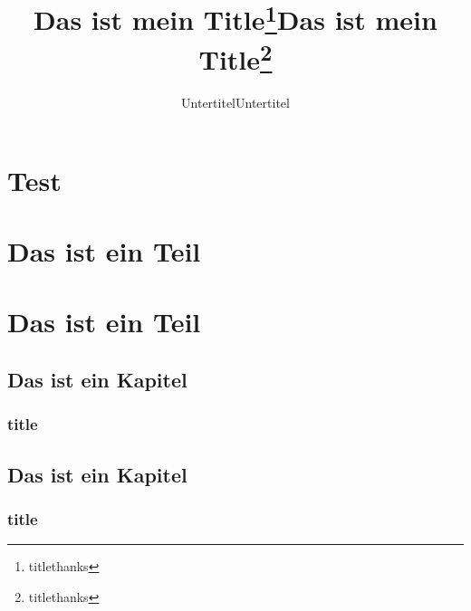 \documentclass[ngerman,%
cd=true,cd=pale,
cdgeometry=false,
cdfont=ultrabold,
headings=heavy,
]{tudscrreprt}
\providecommand{\graduation}[1]{}
\providecommand{\thesis}[1]{}
\begin{document}
%



\title{Das ist mein Title\thanks{titlethanks}}
\subtitle{Untertitel}

\part{Test}

\maketitle

\begingroup
{}
\part{Das ist ein Teil}
\endgroup

\part{Das ist ein Teil}

\chapter{Das ist ein Kapitel}

\blindtext

\section{title}
\chapter{Das ist ein Kapitel}

\blindtext

\section{title}
\clearpage

\blindtext

\textbf{\blindtext}



\titlehead{Titelkopf}
\title{Das ist mein Title\thanks{titlethanks}}
\graduation{graduation}
\subtitle{Untertitel}
\subject{disss}
\thesis{diss\thanks{thesisthanks}}
\publishers{arg1Hallo do}
\end{document}
